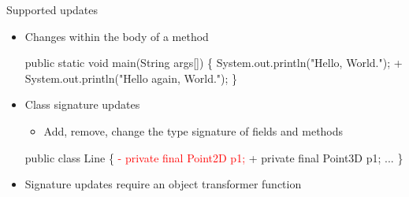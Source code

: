 \newcommand{\removed}[1]{\textcolor{red}{- #1}}
\newcommand{\addedxx}[1]{\textcolor{OliveGreen}{+ #1}}

\begin{frame}[fragile]{Supported updates}%
\begin{itemize}
\item Changes within the body of a method \\
\begin{footnotesize}
\begin{semiverbatim}
  public static void main(String args[]) \{
    System.out.println("Hello, World.");
\addedxx{  System.out.println("Hello again, World.");}
  \}
\end{semiverbatim}
\end{footnotesize}
\item Class signature updates
  \begin{itemize}
  \item Add, remove, change the type signature of fields and methods
  \end{itemize}
\begin{footnotesize}
\begin{semiverbatim}
  public class Line \{
\removed{  private final Point2D p1;}
\addedxx{  private final Point3D p1;}
    ...
  \}
\end{semiverbatim}
\end{footnotesize}
\item Signature updates require an object transformer function
\end{itemize}
\end{frame}


